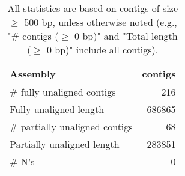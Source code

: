 \documentclass[12pt,a4paper]{article}
\begin{document}
\begin{table}[ht]
\begin{center}
\caption{All statistics are based on contigs of size $\geq$ 500 bp, unless otherwise noted (e.g., "\# contigs ($\geq$ 0 bp)" and "Total length ($\geq$ 0 bp)" include all contigs).}
\begin{tabular}{|l*{1}{|r}|}
\hline
Assembly & contigs \\ \hline
\# fully unaligned contigs & 216 \\ \hline
Fully unaligned length & 686865 \\ \hline
\# partially unaligned contigs & 68 \\ \hline
Partially unaligned length & 283851 \\ \hline
\# N's & 0 \\ \hline
\end{tabular}
\end{center}
\end{table}
\end{document}

